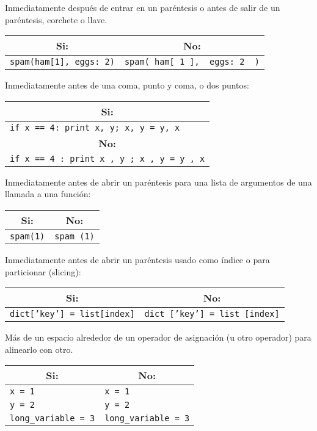 Inmediatamente después de entrar en un paréntesis o antes de salir de un paréntesis, corchete o llave.
\begin{center}
\begin{tabular}{| l | l |}
\hline
\multicolumn{1}{|c|}{\textbf{Si:}} & \multicolumn{1}{c|}{\textbf{No:}} \\ \hline
\texttt{spam(ham[1], {eggs: 2})} & \texttt{spam( ham[ 1 ], { eggs: 2 } )} \\ \hline
\end{tabular}
\end{center}
Inmediatamente antes de una coma, punto y coma, o dos puntos:
\begin{center}
\begin{tabular}{| l |}
\hline
\multicolumn{1}{|c|}{\textbf{Si:}} \\ \hline 
\texttt{if x == 4: print x, y; x, y = y, x} \\ \hline
\multicolumn{1}{c|}{\textbf{No:}} \\ \hline
\texttt{if x == 4 : print x , y ; x , y = y , x} \\ \hline
\end{tabular}
\end{center}
Inmediatamente antes de abrir un paréntesis para una lista de argumentos de una llamada a una función:
\begin{center}
\begin{tabular}{| l | l |}
\hline
\multicolumn{1}{|c|}{\textbf{Si:}} & \multicolumn{1}{c|}{\textbf{No:}} \\ \hline
\texttt{spam(1)} & \texttt{spam (1)} \\ \hline
\end{tabular}
\end{center}
Inmediatamente antes de abrir un paréntesis usado como índice o para particionar (slicing):
\begin{center}
\begin{tabular}{| l | l |}
\hline
\multicolumn{1}{|c|}{\textbf{Si:}} & \multicolumn{1}{c|}{\textbf{No:}} \\ \hline
\texttt{dict['key'] = list[index]} & \texttt{dict ['key'] = list [index]} \\ \hline
\end{tabular}
\end{center}
Más de un espacio alrededor de un operador de asignación (u otro operador) para alinearlo con otro.
\begin{center}
\begin{tabular}{| l | l |}
\hline
\multicolumn{1}{|c|}{\textbf{Si:}} & \multicolumn{1}{c|}{\textbf{No:}} \\ \hline
\texttt{x = 1} & \texttt{x \hspace{2.7cm} = 1} \\
\texttt{y = 2} & \texttt{y \hspace{2.7cm} = 2} \\
\texttt{long\_variable = 3} &  \texttt{long\_variable = 3} \\ \hline
\end{tabular}
\end{center}
